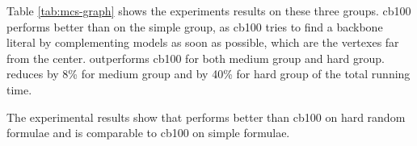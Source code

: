 Table \ref{tab:mcs-graph} shows the experiments results on these three groups. cb100 performs better than \tool on the simple group, as cb100 tries to find a backbone literal by complementing models as soon as possible, which are the vertexes far from the center.
\tool outperforms cb100 for both medium group and hard group.
\tool reduces by 8\% for medium group and by 40\% for hard group of the total running time.





The experimental results show that \tool performs better than cb100 on hard random formulae and is comparable to cb100 on simple formulae.




